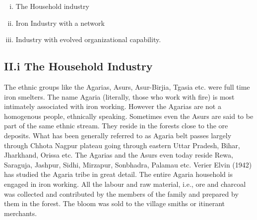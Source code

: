 \begin{enumerate}[i.]
\item The Household industry
\item Iron Industry with a network
\item Industry with evolved organizational capability.
\end{enumerate}

\subsection*{II.i   The Household Industry}\label{subsection-1}

The ethnic groups like the Agarias, Asurs, Asur-Birjia, Tgasia etc. were full time iron smelters.  The name Agaria (literally, those who work with fire) is most intimately associated with iron working.  However the Agarias are not a homogenous people, ethnically speaking.  Sometimes even the Asurs are said to be part of the same ethnic stream.  They reside in the forests close to the ore deposits. What has been generally referred to as Agaria belt passes largely through Chhota Nagpur plateau going through eastern Uttar Pradesh, Bihar, Jharkhand, Orissa etc. The Agarias and the Asurs even today reside Rewa, Saraguja, Jashpur, Sidhi, Mirzapur, Sonbhadra, Palamau etc. Verier Elvin (1942) has studied the Agaria tribe in great detail. The entire Agaria household is engaged in iron working. All the labour and raw material, i.e., ore and charcoal was collected and contributed by the members of the family and prepared by them in the forest. The bloom was sold to the village smiths or itinerant merchants. 

